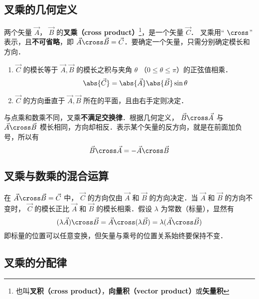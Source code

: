 

\subsection{叉乘的几何定义}

两个矢量 $\vec A$，  $\vec B$ 的\textbf{叉乘（cross product）}\footnote{也叫\textbf{叉积（cross product）}，\textbf{向量积（vector product）}或\textbf{矢量积}}，是一个矢量 $\vec C$．  叉乘用“ $\cross$” 表示，且\textbf{不可省略}，即 $ \vec A \cross \vec B = \vec C$．要确定一个矢量，只需分别确定模长和方向．

\begin{enumerate}
\item $\vec C$ 的模长等于 $\vec A, \vec B$ 的模长之积与夹角 $\theta$ （$0\le\theta \le\pi$）的正弦值相乘．
\begin{equation}\label{Cross_eq1}
\abs{\vec C}  = \abs{\vec A} \abs{\vec B} \sin\theta 
\end{equation}
\item $\vec C$ 的方向垂直于 $\vec A, \vec B$ 所在的平面，且由右手定则决定．
\end{enumerate}

与点乘和数乘不同，叉乘\textbf{不满足交换律}．根据几何定义， $\vec B \cross \vec A$ 与 $\vec A \cross \vec B$ 模长相同，方向却相反．表示某个矢量的反方向，就是在前面加负号，所以有
\begin{equation}\label{Cross_eq11}
\vec B \cross \vec A = -\vec A \cross \vec B
\end{equation}

\subsection{叉乘与数乘的混合运算}

在 $\vec A \cross \vec B = \vec C$ 中， $\vec C$ 的方向仅由 $\vec A$ 和 $\vec B$ 的方向决定．当 $\vec A$ 和 $\vec B$ 的方向不变时， $\vec C$ 的模长正比 $\vec A$ 和 $\vec B$ 的模长相乘．假设 $\lambda $ 为常数（标量），显然有
\begin{equation}
(\lambda \vec A) \cross \vec B = \vec A \cross (\lambda \vec B) = \lambda (\vec A \cross \vec B)
\end{equation}
即标量的位置可以任意变换，但矢量与乘号的位置关系始终要保持不变．

\subsection{叉乘的分配律}

